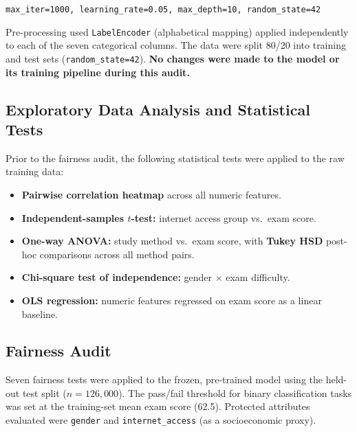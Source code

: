 \documentclass[12pt, letterpaper]{article}
\begin{document}
\begin{center}
\texttt{max\_iter=1000,\ learning\_rate=0.05,\ max\_depth=10,\ random\_state=42}
\end{center}

Pre-processing used \texttt{LabelEncoder} (alphabetical mapping) applied
independently to each of the seven categorical columns. The data were split
80/20 into training and test sets (\texttt{random\_state=42}). \textbf{No
changes were made to the model or its training pipeline during this audit.}

\subsection{Exploratory Data Analysis and Statistical Tests}

Prior to the fairness audit, the following statistical tests were applied to the
raw training data:

\begin{itemize}[noitemsep]
    \item \textbf{Pairwise correlation heatmap} across all numeric features.
    \item \textbf{Independent-samples $t$-test:} internet access group vs.\ exam score.
    \item \textbf{One-way ANOVA:} study method vs.\ exam score, with \textbf{Tukey HSD} post-hoc comparisons across all method pairs.
    \item \textbf{Chi-square test of independence:} gender $\times$ exam difficulty.
    \item \textbf{OLS regression:} numeric features regressed on exam score as a linear baseline.
\end{itemize}

\subsection{Fairness Audit}

Seven fairness tests were applied to the frozen, pre-trained model using the held-out
test split ($n = 126{,}000$). The pass/fail threshold for binary classification tasks
was set at the training-set mean exam score (62.5). Protected attributes evaluated
were \texttt{gender} and \texttt{internet\_access} (as a socioeconomic proxy).
\end{document}
